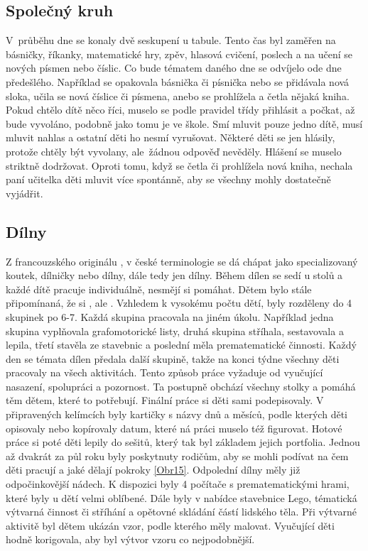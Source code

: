 			\subsection{Společný kruh}
			V průběhu dne se konaly dvě seskupení u tabule. Tento čas byl zaměřen na básničky, říkanky, matematické hry, zpěv, hlasová cvičení, poslech a na učení se nových písmen nebo číslic. Co bude tématem daného dne se odvíjelo ode dne předešlého. Například se opakovala básnička či písnička nebo se přidávala nová sloka, učila se nová číslice či písmena, anebo se prohlížela a četla nějaká kniha. Pokud chtělo dítě něco říci, muselo se podle pravidel třídy přihlásit a počkat, až bude vyvoláno, podobně jako tomu je ve škole. Smí mluvit pouze jedno dítě, musí mluvit nahlas a ostatní děti ho nesmí vyrušovat. Některé děti se jen hlásily, protože chtěly být vyvolany, ale žádnou odpověď nevěděly. Hlášení se muselo striktně dodržovat. Oproti tomu, když se četla či prohlížela nová kniha, nechala paní učitelka děti mluvit více spontánně, aby se všechny mohly dostatečně vyjádřit.

		\subsection{Dílny}
			Z francouzského originálu , v české terminologie se dá chápat jako specializovaný koutek, dílničky nebo dílny, dále tedy jen dílny. 
			Během dílen se sedí u stolů a každé dítě pracuje individuálně, nesmějí si pomáhat. Dětem bylo stále připomínaná, že si , ale . Vzhledem k vysokému počtu dětí, byly rozděleny do 4 skupinek po 6-7. Každá skupina pracovala na jiném úkolu. Například jedna skupina vyplňovala grafomotorické listy, druhá skupina stříhala, sestavovala a lepila, třetí stavěla ze stavebnic a poslední měla prematematické činnosti. Každý den se témata dílen předala další skupině, takže na konci týdne všechny děti pracovaly na všech aktivitách. Tento způsob práce vyžaduje od vyučující nasazení, spolupráci a pozornost. Ta postupně obchází všechny stolky a pomáhá těm dětem, které to potřebují. Finální práce si děti sami podepisovaly. V připravených kelímcích byly kartičky s názvy dnů a měsíců, podle kterých děti opisovaly nebo kopírovaly datum, které ná práci muselo též figurovat. Hotové práce si poté děti lepily do sešitů, který tak byl základem jejich portfolia. Jednou až dvakrát za půl roku byly poskytnuty rodičům, aby se mohli podívat na čem děti pracují a jaké dělají pokroky \ref{Obr15}. Odpolední dílny měly již odpočinkovější nádech. K dispozici byly 4 počítače s prematematickými hrami, které byly u dětí velmi oblíbené. Dále byly v nabídce stavebnice Lego, tématická výtvarná činnost či stříhání a opětovné skládání částí lidského těla. Při výtvarné aktivitě byl dětem ukázán vzor, podle kterého měly malovat. Vyučující děti hodně korigovala, aby byl výtvor vzoru co nejpodobnější.


